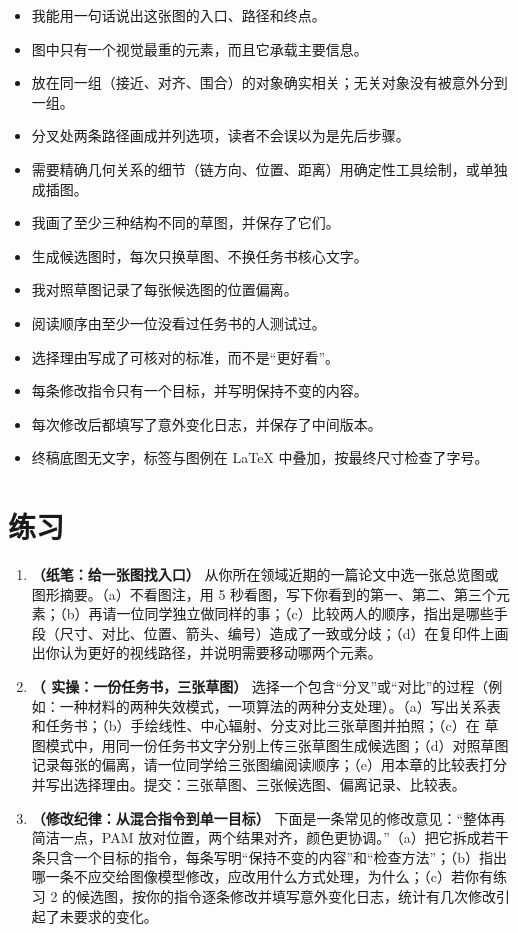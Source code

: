 \begin{itemize}
\item 我能用一句话说出这张图的入口、路径和终点。
\item 图中只有一个视觉最重的元素，而且它承载主要信息。
\item 放在同一组（接近、对齐、围合）的对象确实相关；无关对象没有被意外分到一组。
\item 分叉处两条路径画成并列选项，读者不会误以为是先后步骤。
\item 需要精确几何关系的细节（链方向、位置、距离）用确定性工具绘制，或单独成插图。
\item 我画了至少三种结构不同的草图，并保存了它们。
\item 生成候选图时，每次只换草图、不换任务书核心文字。
\item 我对照草图记录了每张候选图的位置偏离。
\item 阅读顺序由至少一位没看过任务书的人测试过。
\item 选择理由写成了可核对的标准，而不是“更好看”。
\item 每条修改指令只有一个目标，并写明保持不变的内容。
\item 每次修改后都填写了意外变化日志，并保存了中间版本。
\item 终稿底图无文字，标签与图例在 LaTeX 中叠加，按最终尺寸检查了字号。
\end{itemize}

\section{练习}

\begin{enumerate}
\item \textbf{（纸笔：给一张图找入口）} 从你所在领域近期的一篇论文中选一张总览图或图形摘要。（a）不看图注，用 5 秒看图，写下你看到的第一、第二、第三个元素；（b）再请一位同学独立做同样的事；（c）比较两人的顺序，指出是哪些手段（尺寸、对比、位置、箭头、编号）造成了一致或分歧；（d）在复印件上画出你认为更好的视线路径，并说明需要移动哪两个元素。
\item \textbf{（\scidraw{} 实操：一份任务书，三张草图）} 选择一个包含“分叉”或“对比”的过程（例如：一种材料的两种失效模式，一项算法的两种分支处理）。（a）写出关系表和任务书；（b）手绘线性、中心辐射、分支对比三张草图并拍照；（c）在 \scidraw{} 草图模式中，用同一份任务书文字分别上传三张草图生成候选图；（d）对照草图记录每张的偏离，请一位同学给三张图编阅读顺序；（e）用本章的比较表打分并写出选择理由。提交：三张草图、三张候选图、偏离记录、比较表。
\item \textbf{（修改纪律：从混合指令到单一目标）} 下面是一条常见的修改意见：“整体再简洁一点，PAM 放对位置，两个结果对齐，颜色更协调。”（a）把它拆成若干条只含一个目标的指令，每条写明“保持不变的内容”和“检查方法”；（b）指出哪一条不应交给图像模型修改，应改用什么方式处理，为什么；（c）若你有练习 2 的候选图，按你的指令逐条修改并填写意外变化日志，统计有几次修改引起了未要求的变化。
\end{enumerate}

